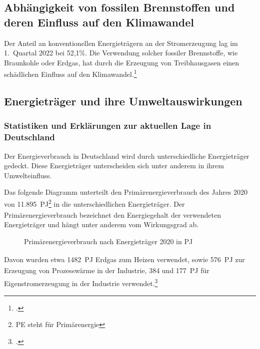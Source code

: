\documentclass[12pt, ngerman]{article}
\newcommand{\pe}{_{\text{PE}}}
\begin{document}
    \subsection{Abhängigkeit von fossilen Brennstoffen und deren Einfluss auf den Klimawandel}

    Der Anteil an konventionellen Energieträgern an der Stromerzeugung lag im 1.\ Quartal 2022 bei 52,1\%.
    Die Verwendung solcher fossiler Brennstoffe, wie Braunkohle oder Erdgas, hat durch die Erzeugung von
    Treibhausgasen einen schädlichen Einfluss auf den Klimawandel.\footcite{wilkeErneuerbareUndKonventionelle2013}

    \subsection{Energieträger und ihre Umweltauswirkungen}

    \subsubsection{Statistiken und Erklärungen zur aktuellen Lage in Deutschland}\label{subsec:primar}

    Der Energieverbrauch in Deutschland wird durch unterschiedliche Energieträger gedeckt.
    Diese Energieträger unterscheiden sich unter anderem in ihrem Umwelteinfluss.

    Das folgende Diagramm unterteilt den Primärenergieverbrauch des Jahres 2020 von
    \qty{11.895}{PJ\pe}\footnote{PE steht für Primärenergie}
    in die unterschiedlichen Energieträger.
    Der Primärenergieverbrauch bezeichnet den Energiegehalt der verwendeten Energieträger und hängt unter anderem vom
    Wirkungsgrad ab.

    \begin{figure}[!h]
        \caption{Primärenergieverbrauch nach Energieträger 2020 in \unit{PJ\pe}}
        \label{fig:pie}
    \end{figure}

    Davon wurden etwa \qty{1482}{PJ\pe} Erdgas zum Heizen verwendet, sowie \qty{576}{PJ\pe}
    zur Erzeugung von Prozesswärme in der Industrie, \qty{384}{} und \qty{177}{PJ\pe} für Eigenstromerzeugung in der
    Industrie verwendet.\footcite{Industrie, Energieflussbild2020PJLang, WieKannTransformation}
\end{document}
